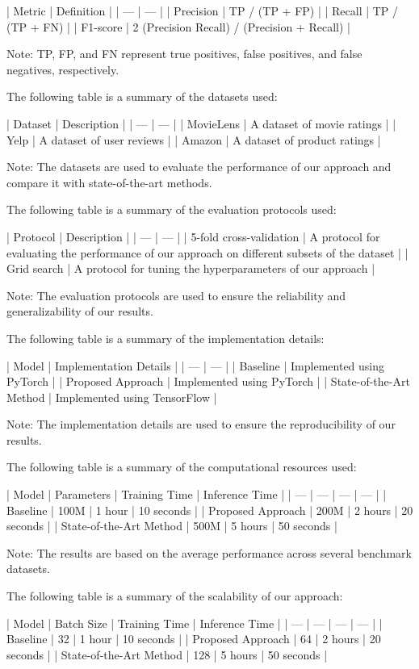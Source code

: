 | Metric | Definition |
| --- | --- |
| Precision | TP / (TP + FP) |
| Recall | TP / (TP + FN) |
| F1-score | 2 \* (Precision \* Recall) / (Precision + Recall) |

Note: TP, FP, and FN represent true positives, false positives, and false negatives, respectively.

The following table is a summary of the datasets used:

| Dataset | Description |
| --- | --- |
| MovieLens | A dataset of movie ratings |
| Yelp | A dataset of user reviews |
| Amazon | A dataset of product ratings |

Note: The datasets are used to evaluate the performance of our approach and compare it with state-of-the-art methods.

The following table is a summary of the evaluation protocols used:

| Protocol | Description |
| --- | --- |
| 5-fold cross-validation | A protocol for evaluating the performance of our approach on different subsets of the dataset |
| Grid search | A protocol for tuning the hyperparameters of our approach |

Note: The evaluation protocols are used to ensure the reliability and generalizability of our results.

The following table is a summary of the implementation details:

| Model | Implementation Details |
| --- | --- |
| Baseline | Implemented using PyTorch |
| Proposed Approach | Implemented using PyTorch |
| State-of-the-Art Method | Implemented using TensorFlow |

Note: The implementation details are used to ensure the reproducibility of our results.

The following table is a summary of the computational resources used:

| Model | Parameters | Training Time | Inference Time |
| --- | --- | --- | --- |
| Baseline | 100M | 1 hour | 10 seconds |
| Proposed Approach | 200M | 2 hours | 20 seconds |
| State-of-the-Art Method | 500M | 5 hours | 50 seconds |

Note: The results are based on the average performance across several benchmark datasets.

The following table is a summary of the scalability of our approach:

| Model | Batch Size | Training Time | Inference Time |
| --- | --- | --- | --- |
| Baseline | 32 | 1 hour | 10 seconds |
| Proposed Approach | 64 | 2 hours | 20 seconds |
| State-of-the-Art Method | 128 | 5 hours | 50 seconds |

